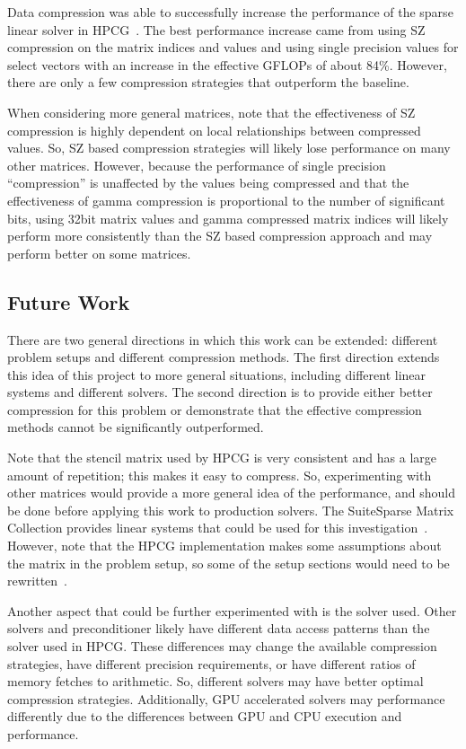 Data compression was able to successfully increase the performance of the sparse linear solver in HPCG~\cite{Dongarra:2015:HPCG}.
The best performance increase came from using SZ compression on the matrix indices and values and using single precision values for select vectors with an increase in the effective GFLOPs of about 84\%.
However, there are only a few compression strategies that outperform the baseline.

When considering more general matrices, note that the effectiveness of SZ compression is highly dependent on local relationships between compressed values.
So, SZ based compression strategies will likely lose performance on many other matrices.
However, because the performance of single precision ``compression'' is unaffected by the values being compressed and that the effectiveness of gamma compression is proportional to the number of significant bits, using 32bit matrix values and gamma compressed matrix indices will likely perform more consistently than the SZ based compression approach and may perform better on some matrices.

\subsection{Future Work}
There are two general directions in which this work can be extended: different problem setups and different compression methods.
The first direction extends this idea of this project to more general situations, including different linear systems and different solvers.
The second direction is to provide either better compression for this problem or demonstrate that the effective compression methods cannot be significantly outperformed.

Note that the stencil matrix used by HPCG is very consistent and has a large amount of repetition; this makes it easy to compress.
So, experimenting with other matrices would provide a more general idea of the performance, and should be done before applying this work to production solvers.
The SuiteSparse Matrix Collection provides linear systems that could be used for this investigation~\cite{Davis:2011:FloridaMatrixCollection}.
However, note that the HPCG implementation makes some assumptions about the matrix in the problem setup, so some of the setup sections would need to be rewritten~\cite{Dongarra:2015:HPCG}.

Another aspect that could be further experimented with is the solver used.
Other solvers and preconditioner likely have different data access patterns than the solver used in HPCG.
These differences may change the available compression strategies, have different precision requirements, or have different ratios of memory fetches to arithmetic.
So, different solvers may have better optimal compression strategies.
Additionally, GPU accelerated solvers may performance differently due to the differences between GPU and CPU execution and performance.

